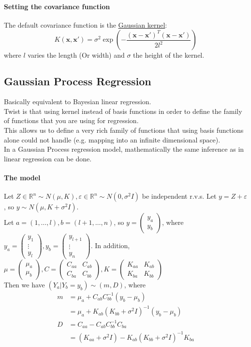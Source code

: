 \documentclass[11pt]{article}
\newcommand{\tb}[1]{\textbf{#1}}
\newcommand{\under}[1]{\underline{#1}}
\newcommand{\real}[0]{\mathbb{R}}
\newcommand{\vx}[0]{\tb{x}}
\begin{document}
\paragraph{Setting the covariance function}
The default covariance function is the \under{Gaussian kernel}:
$$K(\vx, \vx') = \sigma^2\exp(-\frac{(\vx-\vx')^T(\vx-\vx')}{2l^2})$$
where $l$ varies the length (Or width) and $\sigma$ the height of the kernel.
\subsection{Gaussian Process Regression}
Basically equivalent to Bayesian linear regression.\\
Twist is that using kernel instead of basis functions in order to define the family of functions that you are using for regression.\\
This allows us to define a very rich family of functions that using basis functions alone could not handle (e.g. mapping into an infinite dimensional space).\\
In a Gaussian Process regression model, mathematically the same inference as in linear regression can be done.
\paragraph{The model}
Let $Z \in \real^n \sim N(\mu, K), \varepsilon \in \real^n \sim N(0, \sigma^2I)$ be independent r.v.s. Let $y = Z + \varepsilon$, so $y \sim N(\mu, K+\sigma^2I)$.\\
Let $a = (1, \hdots, l), b = (l+1, \hdots, n)$, so $y = \begin{pmatrix}
	y_a \\ y_b \end{pmatrix}$, where $y_a = \begin{pmatrix} y_1 \\ \vdots \\y_l
	\end{pmatrix}, y_b = \begin{pmatrix} y_{l+1} \\ \vdots \\ y_n \end{pmatrix}$.
	In addition, $\mu = \begin{pmatrix} \mu_a \\ \mu_b \end{pmatrix}, C = \begin{pmatrix} C_{aa} & C_{ab} \\ C_{ba} & C_{bb} \end{pmatrix}, K = \begin{pmatrix} K_{aa} & K_{ab} \\ K_{ba} & K_{bb} \end{pmatrix}$\\
Then we have $(Y_a | Y_b = y_b) \sim (m, D)$, where 
\begin{align*}
	m &= \mu_a + C_{ab}C^{-1}_{bb}(y_b - \mu_b) \\
	&= \mu_a +K_{ab}(K_{bb} + \sigma^2 I)^{-1}(y_b - \mu_b)\\
	D &= C_{aa} - C_{ab}C^{-1}_{bb}C_{ba} \\
	&= (K_{aa}+\sigma^2 I)-K_{ab}(K_{bb}+\sigma^2I)^{-1}K_{ba}
\end{align*}
\end{document}
